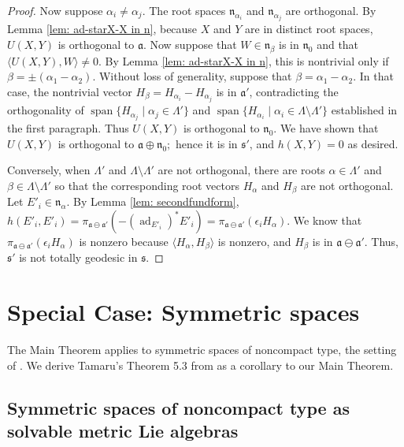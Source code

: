 \documentclass[12pt]{amsart}
\newcommand{\la}{\langle}
\newcommand{\ra}{\rangle}
\newcommand{\myspan}{\operatorname{span}}
\newcommand{\fraka}{\ensuremath{\mathfrak{a}} }
\newcommand{\frakn}{\ensuremath{\mathfrak{n}} }
\newcommand{\fraks}{\ensuremath{\mathfrak{s}} }
\renewcommand\a{{\mathfrak{a}}}
\newcommand\n{{\mathfrak{n}}}
\newcommand\s{{\mathfrak{s}}}
\newcommand\ad{\operatorname{ad}}
\theoremstyle{plain}
\theoremstyle{definition}
\theoremstyle{remark}
\numberwithin{equation}{section}
\numberwithin{theorem}{section}
\begin{document}
\begin{proof}
Now suppose $\alpha_i \ne \alpha_j.$    The root spaces 
$\frakn_{\alpha_i}$ and $\frakn_{\alpha_j}$ are orthogonal.
By Lemma  \ref{lem: ad-starX-X in n}, because $X$ and $Y$ 
are in distinct root spaces, $U(X,Y)$ is orthogonal to $\fraka$. 
Now suppose that $W \in \n_\beta$ is in $\n_0$ and that
$\la U(X,Y), W \ra \neq 0.$  By Lemma \ref{lem: ad-starX-X in n}, this
is nontrivial only if $\beta = \pm(\alpha_1 - \alpha_2 )$. 
Without loss of generality, suppose that $\beta=\alpha_1 - \alpha_2.$  
In that case, the nontrivial vector 
$H_\beta = H_{\alpha_i} - H_{\alpha_j}$ is in $\fraka'$, contradicting 
the orthogonality of $\myspan\{H_{\alpha_j} \mid \alpha_j \in \Lambda' \}$
and $\myspan \{ H_{\alpha_i} \mid \alpha_i \in  
\Lambda \setminus \Lambda'\}$ established in the first paragraph. 
Thus $U(X,Y)$ is orthogonal to $\n_0$. 
We have shown that $U(X,Y)$ is orthogonal to $\fraka \oplus \frakn_0;$ 
hence it is in $\fraks'$, and $h(X,Y)=0$ as desired. 

Conversely, when $\Lambda'$ and $\Lambda \setminus \Lambda'$ are not orthogonal, there are roots 
$\alpha \in \Lambda'$ and $\beta \in \Lambda \setminus \Lambda'$ 
so that the corresponding root vectors $H_\alpha$ and $H_\beta$ are
not orthogonal. Let $E'_i \in \n_\alpha$. By Lemma \ref{lem: secondfundform}, 
$h(E'_i,E'_i) = \pi_{\a \ominus \a'}(-(\ad_{E'_i})^* E'_i) = \pi_{\a \ominus \a'}(\epsilon_i H_\alpha)$. We know that
 $\pi_{\a \ominus \a'}(\epsilon_i H_\alpha)$ is nonzero because $\la H_\alpha, H_\beta \ra$ is nonzero,   and $H_\beta$ is in $\a \ominus \a'$. Thus,  $\s'$ is not totally geodesic in 
 $\s$.
\end{proof}

\section{Special Case: Symmetric spaces}\label{section: symmetric spaces}

The Main Theorem  applies to symmetric spaces of noncompact type, the setting of \cite{tamaru-11}.
We derive Tamaru's Theorem 5.3 from  \cite{tamaru-11} as a corollary to our Main Theorem. 

\subsection{Symmetric spaces of noncompact type as solvable metric Lie algebras}\label{subsection: symmetric space}
\end{document}
